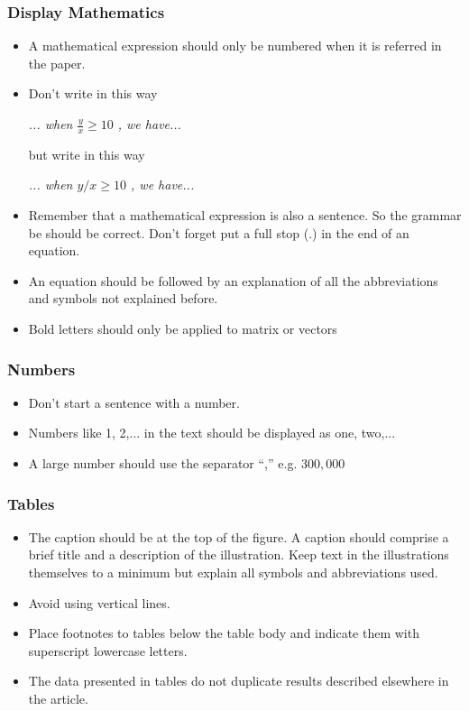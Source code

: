 \documentclass[10pt]{beamer}
\begin{document}
\begin{frame}
  \frametitle{Display Mathematics}

  \begin{itemize}
  \item A mathematical expression should only be numbered when it is referred in the paper.
  \item Don't write in this way

    \emph{... when $\frac{y}{x}\geq 10$ , we have...}

    but write in this way

    \emph{... when $y/x \geq 10$ , we have...}


  \item Remember that a mathematical expression is also a sentence. So the
    grammar be should be correct. Don't forget put a full stop (.) in the end
    of an equation.

  \item An equation should be followed by an explanation of all the
    abbreviations and symbols not explained before.

  \item Bold letters should only be applied to matrix or vectors

  \end{itemize}

\end{frame}


\begin{frame}
  \frametitle{Numbers}

\begin{itemize}
\item Don't start a sentence with a number.
\item Numbers like 1, 2,... in the text should be displayed as one, two,...
\item A large number should use the separator ``,'' e.g. $300,000$

\end{itemize}
\end{frame}

\begin{frame}
  \frametitle{Tables}

  \begin{itemize}
  \item The caption should be at the top of the figure.  A caption should
    comprise a brief title and a description of the
    illustration. Keep text in the illustrations themselves to a minimum but
    explain all symbols and abbreviations used.
  \item Avoid using vertical lines.
  \item Place footnotes to tables below the table body and indicate them with
    superscript lowercase letters.
  \item The data presented in tables do not duplicate results described
    elsewhere in the article.
  \end{itemize}
\end{frame}
\end{document}
